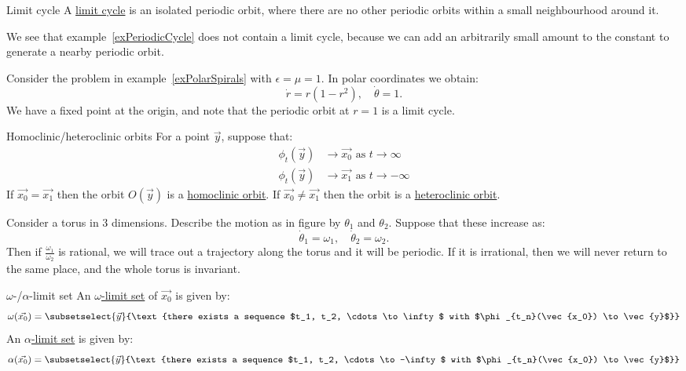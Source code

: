 \documentclass[../Main.tex]{subfiles}
\begin{document}
\begin{definition}{Limit cycle}
    A \underline{limit cycle} is an isolated periodic orbit, where there are no other periodic orbits within a small neighbourhood around it.
\end{definition}
We see that example~\ref{exPeriodicCycle} does not contain a limit cycle, because we can add an arbitrarily small amount to the constant to generate a nearby periodic orbit.
\begin{example}
    Consider the problem in example~\ref{exPolarSpirals} with $\epsilon = \mu = 1$. In polar coordinates we obtain:
    \begin{equation*}
        \dot{r} = r(1-r^2),\quad\dot\theta = 1.
    \end{equation*}
    We have a fixed point at the origin, and note that the periodic orbit at $r = 1$ is a limit cycle.
\end{example}
\begin{definition}{Homoclinic/heteroclinic orbits}
    For a point $\vec{y}$, suppose that:
    \begin{align*}
        \phi_t(\vec{y}) &\to \vec{x_0}\text{ as }t \to \infty\\
        \phi_t(\vec{y}) &\to \vec{x_1}\text{ as }t \to -\infty
    \end{align*}
    If $\vec{x_0} = \vec{x_1}$ then the orbit $O(\vec{y})$ is a \underline{homoclinic orbit}. If $\vec{x_0} \neq \vec{x_1}$ then the orbit is a \underline{heteroclinic orbit}.
\end{definition}
\begin{example}
    Consider a torus in 3 dimensions. Describe the motion as in figure %
    by $\theta_1$ and $\theta_2$. Suppose that these increase as:
    \begin{equation*}
        \dot\theta_1 = \omega_1,\quad \dot\theta_2 = \omega_2.
    \end{equation*}
    Then if $\frac{\omega_1}{\omega_2}$ is rational, we will trace out a trajectory along the torus and it will be periodic. If it is irrational, then we will never return to the same place, and the whole torus is invariant.
\end{example}
\begin{definition}{$\omega$-/$\alpha$-limit set}
    An \underline{$\omega$-limit set} of $\vec{x_0}$ is given by:
    \begin{equation*}
        \omega(\vec{x_0}) = \subsetselect{\vec{y}}{\text{there exists a sequence $t_1, t_2, \cdots \to \infty$ with $\phi_{t_n}(\vec{x_0}) \to \vec{y}$}}
    \end{equation*}
    An \underline{$\alpha$-limit set} is given by:
    \begin{equation*}
        \alpha(\vec{x_0}) = \subsetselect{\vec{y}}{\text{there exists a sequence $t_1, t_2, \cdots \to -\infty$ with $\phi_{t_n}(\vec{x_0}) \to \vec{y}$}}
    \end{equation*}
\end{definition}
\end{document}
